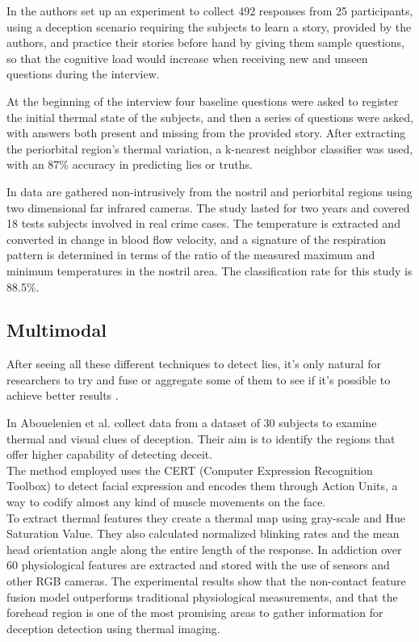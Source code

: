 In \cite{Rajoub} the authors set up an experiment to collect 492 responses from 25 participants, using a deception scenario requiring the subjects to learn a story, provided by the authors, and practice their stories before hand by giving them sample questions, so that the cognitive load would increase when receiving new and unseen questions during the interview.

At the beginning of the interview four baseline questions were asked to register the initial thermal state of the subjects, and then a series of questions were asked, with answers both present and missing from the provided story. After extracting the periorbital region's thermal variation, a k-nearest neighbor classifier was used, with an 87\% accuracy in predicting lies or truths.

In \cite{6967765} data are gathered non-intrusively from the nostril and periorbital regions using two dimensional far infrared cameras. The study lasted for two years and covered 18 tests subjects involved in real crime cases. The temperature is extracted and converted in change in blood flow velocity, and a signature of the respiration pattern is determined in terms of the ratio of the measured maximum and minimum temperatures in the nostril area. The classification rate for this study is 88.5\%.

\subsection{Multimodal}
After seeing all these different techniques to detect lies, it's only natural for researchers to try and fuse or aggregate some of them to see if it's possible to achieve better results \cite{Abouelenien:2014:DDU:2663204.2663229}.

In \cite{Abouelenien:2016:ATV:2910674.2910682} Abouelenien et al. collect data from a dataset of 30 subjects to examine thermal and visual clues of deception. Their aim is to identify the regions that offer higher capability of detecting deceit. \\
The method employed uses the CERT (Computer Expression Recognition Toolbox) to detect facial expression and encodes them through Action Units, a way to codify almost any kind of muscle movements on the face. \\
To extract thermal features they create a thermal map using gray-scale and Hue Saturation Value. They also calculated normalized blinking rates and the mean head orientation angle along the entire length of the response. In addiction over 60 physiological features are extracted and stored with the use of sensors and other RGB cameras. The experimental results show that the non-contact feature fusion model outperforms traditional physiological measurements, and that the forehead region is one of the most promising areas to gather information for deception detection using thermal imaging.

